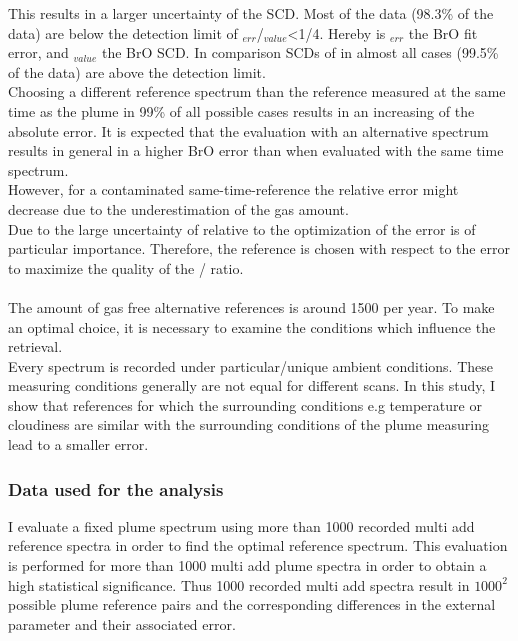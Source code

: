 %
This results in a larger uncertainty of the   SCD. Most of the  data (98.3\% of the data) are below the detection limit of $_{err}$/$_{value}$<1/4. Hereby is $_{err}$ the BrO fit error, and $_{value}$ the BrO SCD. In comparison SCDs of  in almost all cases (99.5\% of the data)  are above the detection limit. \\
%
Choosing a different reference spectrum than the reference measured at the same time as the plume in 99\% of all possible cases results in an increasing of the absolute error. 
It is expected that the evaluation with an alternative spectrum results in general in a higher BrO error than when evaluated with the same time spectrum.\\
However, for a contaminated same-time-reference the relative error might decrease due to the underestimation of the gas amount. \\
Due to the large uncertainty of  relative to  the optimization of the  error is of particular importance. Therefore, the reference is chosen with respect to the  error to maximize the quality of the / ratio. \\
\\
The amount of gas free alternative references is around 1500 per year. To make an optimal choice, it is necessary to examine the conditions which influence the  retrieval.\\
Every spectrum is recorded under particular/unique ambient conditions. These measuring conditions generally are not equal for different scans. In this study, I show that references for which the surrounding conditions e.g temperature or cloudiness are similar with the surrounding conditions of the  plume measuring lead to a smaller error.\\
%
\subsubsection*{Data used for the analysis}
I evaluate a fixed plume spectrum using more than 1000 recorded multi add reference spectra in order to find the optimal reference spectrum. This evaluation is performed for more than 1000 multi add plume spectra in order to obtain a high statistical significance. Thus 1000 recorded multi add spectra result in $1000^2$ possible plume reference pairs and the corresponding differences in the external parameter and their associated  error. 


